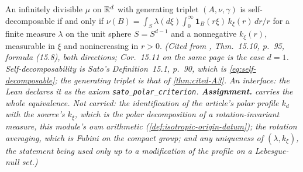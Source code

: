 \begin{theorem}
\label{thm:cited-A2}
\leanok
An infinitely divisible $\mu$ on $\mathbb{R}^d$ with generating triplet $(A,\nu,\gamma)$ is
self-decomposable if and only if
$\nu(B)=\int_S\lambda(d\xi)\int_0^\infty\mathbf 1_B(r\xi)\,k_\xi(r)\,dr/r$ for a finite measure
$\lambda$ on the unit sphere $S=S^{d-1}$ and a nonnegative $k_\xi(r)$, measurable in $\xi$ and
nonincreasing in $r>0$.
\statusA\quad{}\quad\emph{(Cited from , Thm.~15.10, p.~95, formula
(15.8), both directions; Cor.~15.11 on the same page is the case $d = 1$. Self-decomposability is
Sato's Definition~15.1, p.~90, which is \ref{eq:self-decomposable}; the generating triplet is that
of \ref{thm:cited-A3}. An interface: the Lean declares it as the axiom
\texttt{sato\_polar\_criterion}. \textbf{Assignment.}  carries the whole equivalence.
Not carried: the identification of the article's polar profile $k_d$ with the source's $k_\xi$,
which is the polar decomposition of a rotation-invariant measure, this module's own arithmetic
(\ref{def:isotropic-origin-datum}); the rotation averaging, which is Fubini on the compact group;
and any uniqueness of $(\lambda, k_\xi)$, the statement being used only up to a modification of the
profile on a Lebesgue-null set.)}
\end{theorem}

